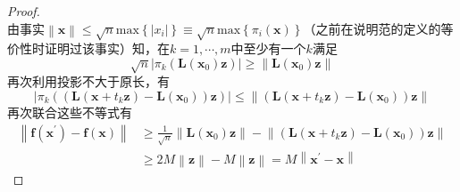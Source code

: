\documentclass[../main.tex]{subfiles}
\begin{document}
\begin{proof}
\[    \]
    由事实$\left\|\mathbf{x}\right\|\leq\sqrt{n}\mathrm{max}\left\{\left|x_i\right|\right\}\equiv\sqrt{n}\mathrm{max}\left\{\pi_i\left(\mathbf{x}\right)\right\}$（之前在说明范的定义的等价性时证明过该事实）知，在$k=1,\cdots,m$中至少有一个$k$满足
    \[
        \sqrt{n}\left|\pi_k\left(\mathbf{L}\left(\mathbf{x}_0\right)\mathbf{z}\right)\right|\geq\left\|\mathbf{L}\left(\mathbf{x}_0\right)\mathbf{z}\right\|
    \]
    再次利用投影不大于原长，有
    \[
        \left|\pi_k\left(\left(\mathbf{L}\left(\mathbf{x}+t_k\mathbf{z}\right)-\mathbf{L}\left(\mathbf{x}_0\right)\right)\mathbf{z}\right)\right|\leq\left\|\left(\mathbf{L}\left(\mathbf{x}+t_k\mathbf{z}\right)-\mathbf{L}\left(\mathbf{x}_0\right)\right)\mathbf{z}\right\|\]
    再次联合这些不等式有
    \begin{align*}
        \left\|\mathbf{f}\left(\mathbf{x}^\prime\right)-\mathbf{f}\left(\mathbf{x}\right)\right\| & \geq\frac{1}{\sqrt{n}}\left\|\mathbf{L}\left(\mathbf{x}_0\right)\mathbf{z}\right\|-\left\|\left(\mathbf{L}\left(\mathbf{x}+t_k\mathbf{z}\right)-\mathbf{L}\left(\mathbf{x}_0\right)\right)\mathbf{z}\right\| \\
                                                                                                  & \geq2M\left\|\mathbf{z}\right\|-M\left\|\mathbf{z}\right\|=M\left\|\mathbf{x}^\prime-\mathbf{x}\right\|
    \end{align*}
\end{proof}
\end{document}
